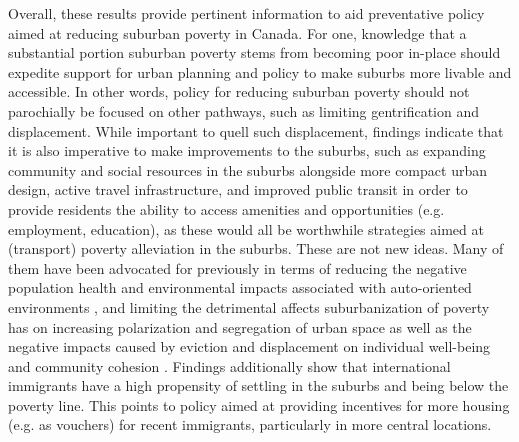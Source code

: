 Overall, these results provide pertinent information to aid preventative policy aimed at reducing suburban poverty in Canada. For one, knowledge that a substantial portion suburban poverty stems from becoming poor in-place should expedite support for urban planning and policy to make suburbs more livable and accessible. In other words, policy for reducing suburban poverty should not parochially be focused on other pathways, such as limiting gentrification and displacement. While important to quell such displacement, findings indicate that it is also imperative to make improvements to the suburbs, such as expanding community and social resources in the suburbs alongside more compact urban design, active travel infrastructure, and improved public transit in order to provide residents the ability to access amenities and opportunities (e.g. employment, education), as these would all be worthwhile strategies aimed at (transport) poverty alleviation in the suburbs. These are not new ideas. Many of them have been advocated for previously in terms of reducing the negative population health and environmental impacts associated with auto-oriented environments , and limiting the detrimental affects suburbanization of poverty has on increasing polarization and segregation of urban space as well as the negative impacts caused by eviction and displacement on individual well-being and community cohesion  . Findings additionally show that international immigrants have a high propensity of settling in the suburbs and being below the poverty line. This points to policy aimed at providing incentives for more housing (e.g. as vouchers) for recent immigrants, particularly in more central locations.








